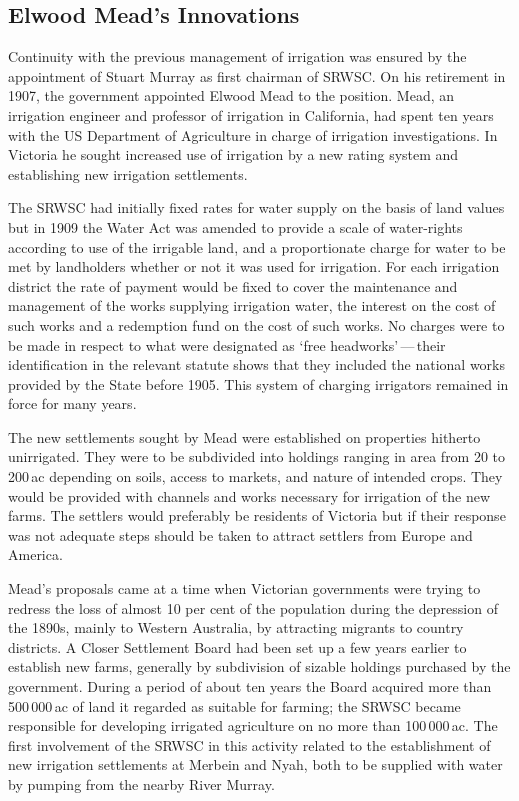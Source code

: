 \subsection*{Elwood Mead's Innovations}

Continuity with the previous management of irrigation was ensured by
the appointment of Stuart Murray as first chairman of SRWSC.  On his
retirement in 1907, the government appointed Elwood Mead to the
position.  Mead, an irrigation engineer and professor of irrigation in
California, had spent ten years with the US Department of Agriculture
in charge of irrigation investigations.  In Victoria he sought
increased use of irrigation by a new rating system and establishing
new irrigation settlements.

The SRWSC had initially fixed rates for water supply on the basis of
land values but in 1909 the Water Act was amended to provide a scale
of water-rights according to use of the irrigable land, and a
proportionate charge for water to be met by landholders whether or not
it was used for irrigation.  For each irrigation district the rate of
payment would be fixed to cover the maintenance and management of the
works supplying irrigation water, the interest on the cost of such
works and a redemption fund on the cost of such works.  No charges
were to be made in respect to what were designated as `free
headworks'\,---\,their identification in the relevant statute shows that
they included the national works provided by the State before 1905.
This system of charging irrigators remained in force for many
years.

The new settlements sought by Mead were established on properties
hitherto unirrigated. They were to be subdivided into holdings ranging
in area from 20 to 200\,ac depending on soils, access to markets, and
nature of intended crops.  They would be provided with channels and
works necessary for irrigation of the new farms.  The settlers would
preferably be residents of Victoria but if their response was not
adequate steps should be taken to attract settlers from Europe and
America.

Mead's proposals came at a time when Victorian governments were trying
to redress the loss of almost 10 per cent of the population during the
depression of the 1890s, mainly to Western Australia, by attracting
migrants to country districts.  A Closer Settlement Board had been set
up a few years earlier to establish new farms, generally by
subdivision of sizable holdings purchased by the government.  During a
period of about ten years the Board acquired more than 500\,000\,ac of
land it regarded as suitable for farming; the SRWSC became responsible
for developing irrigated agriculture on no more than 100\,000\,ac.
The first involvement of the SRWSC in this activity related to the
establishment of new irrigation settlements at Merbein and Nyah, both
to be supplied with water by pumping from the nearby River
Murray.

